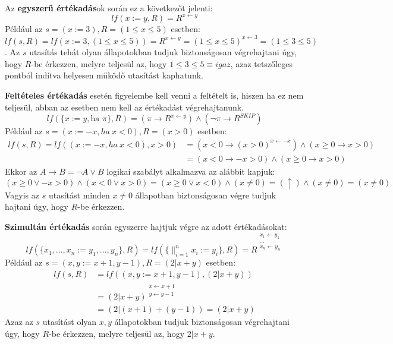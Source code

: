 \documentclass[12pt]{article}
\begin{document}
	Az \textbf{egyszerű értékadás}ok során ez a következőt jelenti:
	$$lf(x := y, R) = R^{x \leftarrow y } $$
	Például az $s = (x := 3), R = (1 \le x \le 5)$ esetben:\\
	$lf(s, R) = lf(x:=3, (1 \le x \le 5)) = R^{x \leftarrow y} = (1 \le x \le 5)^{x \leftarrow 3} = (1 \le 3 \le 5)$.
	Az $s$ utasítás tehát olyan állapotokban tudjuk biztonságosan végrehajtani úgy, hogy $R$-be érkezzen, melyre teljesül az, hogy $1 \le 3 \le 5 \equiv igaz$, azaz tetszőleges pontból indítva helyesen működő utasítást kaphatunk.
	
	\textbf{Feltételes értékadás} esetén figyelembe kell venni a feltételt is, hiszen ha ez nem teljesül, abban az esetben nem kell az értékadást végrehajtanunk.
	$$lf(\{x:=y, \text{ha } \pi\}, R) = (\pi \rightarrow R^{x \leftarrow y}) \land (\neg \pi \rightarrow R^{SKIP})$$
	Például az $s = (x := -x, ha\ x < 0), R = (x > 0)$ esetben:
	\begin{align*}
	lf(s, R) = lf((x := -x, ha\ x < 0), x > 0) &= (x < 0 \rightarrow (x > 0)^{x \leftarrow -x}) \land (x \ge 0 \rightarrow x > 0)\\
	&= (x < 0 \rightarrow -x > 0) \land (x \ge 0 \rightarrow x > 0)
	\end{align*}
	Ekkor az $A \rightarrow B = \neg A \lor B$ logikai szabályt alkalmazva az alábbit kapjuk:
	$$ (x \ge 0 \lor -x > 0) \land (x < 0 \lor x > 0) = (x \ge 0 \lor x < 0) \land (x \neq 0) = (\uparrow) \land (x \neq 0) = (x \neq 0)$$
	Vagyis az $s$ utasítást minden $x \neq 0$ állapotban biztonságosan végre tudjuk hajtani úgy, hogy $R$-be érkezzen.
	
	\textbf{Szimultán értékadás} során egyszerre hajtjuk végre az adott értékadásokat:
	$$lf(\{x_1, ..., x_n := y_1, ..., y_n\}, R) = lf(\{ \mathop{\parallel}_{i=1}^{n} x_i := y_i \}, R) = R^{\substack{ x_1 \leftarrow y_1 \\ ... \\ x_n \leftarrow y_n }}$$
	Például az $s = (x,y := x + 1, y - 1), R = (2 | x + y)$ esetben:
	\begin{align*}
	lf(s, R) &= lf((x,y := x + 1, y - 1), (2 | x + y)) \\
	&= (2 | x + y)^{\substack{ x \leftarrow x + 1 \\ y \leftarrow y - 1 }} \\
	&= (2 | (x + 1) + (y - 1)) = (2 | x + y)
	\end{align*}
	Azaz az $s$ utasítást olyan $x, y$ állapotokban tudjuk biztonságosan végrehajtani úgy, hogy $R$-be érkezzen, melyre teljesül az, hogy $2 | x + y$.
	
\end{document}

